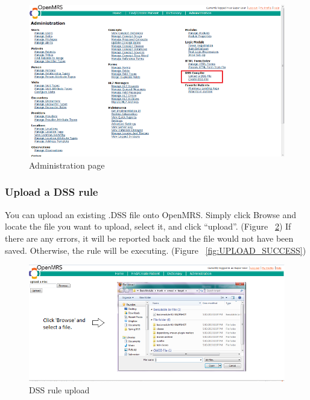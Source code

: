 \documentclass[12pt,letterpaper]{article}
\begin{document}
\begin{figure}\begin{center}
\includegraphics[width=6.5in]{user_guide/administration.png}
\end{center}
\caption{Administration page}
\label{fig:ADMINISTRATION_PAGE}
\end{figure}

\subsubsection{Upload a DSS rule}
	You can upload an existing .DSS file onto OpenMRS. Simply click Browse and locate the file you want to upload, select it, and click “upload”.
	(Figure ~\ref{fig:UPLOAD_BROWSE}) If there are any errors, it will be reported back and the file would not have been saved. Otherwise, the rule will be executing. (Figure ~\ref{fig:UPLOAD_SUCCESS})

\begin{figure}\begin{center}
\includegraphics[width=6.5in]{user_guide/upload_browse.png}
\end{center}
\caption{DSS rule upload}
\label{fig:UPLOAD_BROWSE}
\end{figure}
\end{document}
